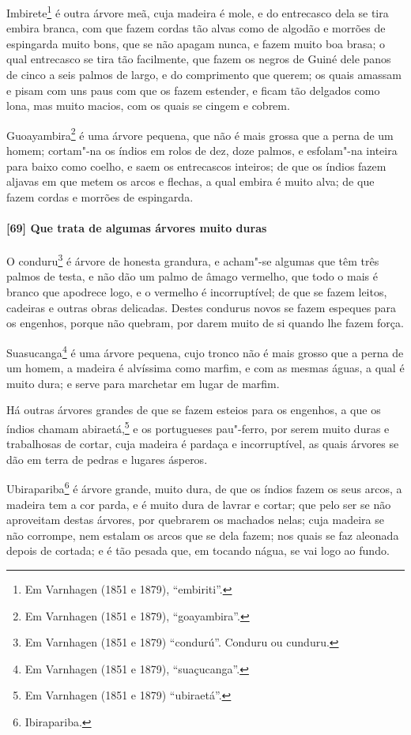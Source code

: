 \begin{linenumbers}
Imbirete\footnote{ Em Varnhagen (1851 e 1879), ``embiriti''.} é outra árvore meã, cuja
madeira é mole, e do entrecasco dela se tira embira branca, com que fazem cordas tão alvas
como de algodão e morrões de espingarda muito bons, que se não apagam nunca, e fazem muito
boa brasa; o qual entrecasco se tira tão facilmente, que fazem os negros de Guiné dele
panos de cinco a seis palmos de largo, e do comprimento que querem; os quais amassam e
pisam com uns paus com que os fazem estender, e ficam tão delgados como lona, mas muito
macios, com os quais se cingem e cobrem.

Guoayambira\footnote{ Em Varnhagen (1851 e 1879), ``goayambira''.} é uma árvore pequena,
que não é mais grossa que a perna de um homem; cortam"-na os índios em rolos de dez, doze
palmos, e esfolam"-na inteira para baixo como coelho, e saem os entrecascos inteiros; de
que os índios fazem aljavas em que metem os arcos e flechas, a qual embira é muito alva;
de que fazem cordas e morrões de espingarda.

\paragraph{[69] Que trata de algumas árvores muito duras}\quad
O conduru\footnote{ Em Varnhagen (1851 e 1879) ``condurú''. Conduru ou cunduru.} é árvore
de honesta grandura, e acham"-se algumas que têm três palmos de testa, e não dão um palmo
de âmago vermelho, que todo o mais é branco que apodrece logo, e o vermelho é
incorruptível; de que se fazem leitos, cadeiras e outras obras delicadas. Destes condurus
novos se fazem espeques para os engenhos, porque não quebram, por darem muito de si quando
lhe fazem força.

Suasucanga\footnote{ Em Varnhagen (1851 e 1879), ``suaçucanga''.} é uma árvore pequena,
cujo tronco não é mais grosso que a perna de um homem, a madeira é alvíssima como marfim,
e com as mesmas águas, a qual é muito dura; e serve para marchetar em lugar de marfim.

Há outras árvores grandes de que se fazem esteios para os engenhos, a que os índios chamam
abiraetá,\footnote{ Em Varnhagen (1851 e 1879) ``ubiraetá''.} e os portugueses pau"-ferro,
por serem muito duras e trabalhosas de cortar, cuja madeira é pardaça e incorruptível, as
quais árvores se dão em terra de pedras e lugares ásperos.

Ubirapariba\footnote{ Ibirapariba.} é árvore grande, muito dura, de que os índios fazem os
seus arcos, a madeira tem a cor parda, e é muito dura de lavrar e cortar; que pelo ser se
não aproveitam destas árvores, por quebrarem os machados nelas; cuja madeira se não
corrompe, nem estalam os arcos que se dela fazem; nos quais se faz aleonada depois de
cortada; e é tão pesada que, em tocando nágua, se vai logo ao fundo.


\end{linenumbers}
